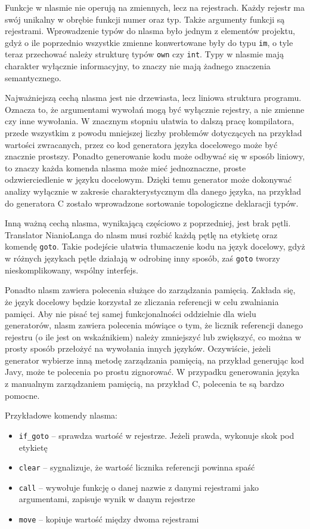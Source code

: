 \documentclass[licencjacka]{pracamgr}
\begin{document}
Funkcje w nlasmie nie operują na zmiennych, lecz na rejestrach. Każdy rejestr ma swój unikalny w obrębie funkcji numer oraz typ. Także argumenty
funkcji są rejestrami. Wprowadzenie typów do nlasma było jednym z elementów projektu, gdyż o ile poprzednio wszystkie zmienne konwertowane były do
typu \texttt{im}, o tyle teraz przechować należy strukturę typów \texttt{own} czy \texttt{int}. Typy w nlasmie mają charakter wyłącznie informacyjny,
to znaczy nie mają żadnego znaczenia semantycznego.

Najważniejszą cechą nlasma jest nie drzewiasta, lecz liniowa struktura programu. Oznacza to, że argumentami wywołań mogą być wyłącznie rejestry, a nie
zmienne czy inne wywołania. W znacznym stopniu ułatwia to dalszą pracę kompilatora, przede wszystkim z powodu mniejszej liczby problemów dotyczących na
przykład wartości zwracanych, przez co kod generatora języka docelowego może być znacznie prostszy. Ponadto generowanie kodu może odbywać się w sposób
liniowy, to znaczy każda komenda nlasma może mieć jednoznaczne, proste odzwierciedlenie w języku docelowym. Dzięki temu generator może dokonywać
analizy wyłącznie w zakresie charakterystycznym dla danego języka, na przykład do generatora C zostało wprowadzone sortowanie topologiczne deklaracji
typów.

Inną ważną cechą nlasma, wynikającą częściowo z poprzedniej, jest brak pętli. Translator NianioLanga do nlasm musi rozbić każdą pętlę na etykietę oraz
komendę \texttt{goto}. Takie podejście ułatwia tłumaczenie kodu na język docelowy, gdyż w różnych językach pętle działają w odrobinę inny sposób, zaś
\texttt{goto} tworzy nieskomplikowany, wspólny interfejs.

Ponadto nlasm zawiera polecenia służące do zarządzania pamięcią. Zakłada się, że język docelowy będzie korzystał ze zliczania referencji w celu
zwalniania pamięci. Aby nie pisać tej samej funkcjonalności oddzielnie dla wielu generatorów, nlasm zawiera polecenia mówiące o tym, że licznik
referencji danego rejestru (o ile jest on wskaźnikiem) należy zmniejszyć lub zwiększyć, co można w prosty sposób przełożyć na wywołania innych
języków. Oczywiście, jeżeli generator wybierze inną metodę zarządzania pamięcią, na przykład generując kod Javy, może te polecenia po prostu
zignorować. W przypadku generowania języka z manualnym zarządzaniem pamięcią, na przykład C, polecenia te są bardzo pomocne.


Przykładowe komendy nlasma:
\begin{itemize}
\item \texttt{if\_goto} -- sprawdza wartość w rejestrze. Jeżeli prawda, wykonuje skok pod etykietę
\item \texttt{clear} -- sygnalizuje, że wartość licznika referencji powinna spaść
\item \texttt{call} -- wywołuje funkcję o danej nazwie z danymi rejestrami jako argumentami, zapisuje wynik w danym rejestrze
\item \texttt{move} -- kopiuje wartość między dwoma rejestrami
\end{itemize}
\end{document}
